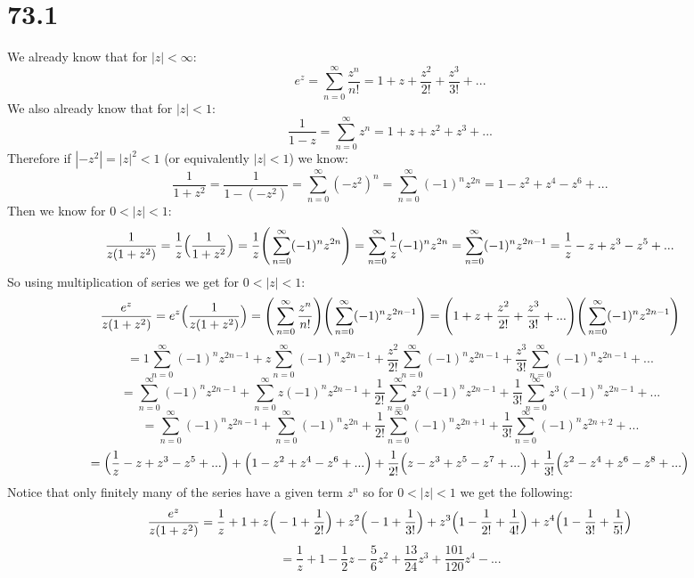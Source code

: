 \documentclass{article}
\begin{document}
\section*{73.1}
\begin{center}
    \doublespacing
    We already know that for $|z| <\infty$:
    \[e^z =\sum _{n=0}^{\infty}\frac{z^n}{n!} = 1 + z +\frac{z^2}{2!} +\frac{z^3}{3!} + ...\]
    We also already know that for $|z| < 1$:
    \[\frac{1}{1 - z} =\sum _{n=0}^{\infty} z^n = 1 + z + z^2 + z^3 + ...\]
    Therefore if $|-z^2| = |z|^2 < 1$ (or equivalently $|z| < 1$) we know:
    \[\frac{1}{1 + z^2} =\frac{1}{1 - (-z^2)} =\sum _{n=0}^{\infty} (-z^2)^n =\sum _{n=0}^{\infty} (-1)^n z^{2n} = 1 - z^2 + z^4 - z^6 + ...\]
    Then we know for $0 < |z| < 1$:
    \[\frac{1}{z(1 + z^2)} =\frac{1}{z}\Big{(}\frac{1}{1 + z^2}\Big{)} =\frac{1}{z}\Bigg{(}\sum _{n=0}^{\infty} (-1)^n z^{2n}\Bigg{)} =\sum _{n=0}^{\infty}\frac{1}{z}(-1)^n z^{2n} =\sum _{n=0}^{\infty} (-1)^n z^{2n-1} =\frac{1}{z} - z + z^3 - z^5 + ...\]
    \break
    So using multiplication of series we get for $0 < |z| < 1$:
    \[\frac{e^z}{z(1 + z^2)} = e^z\Big{(}\frac{1}{z(1 + z^2)}\Big{)} =\Bigg{(}\sum _{n=0}^{\infty}\frac{z^n}{n!}\Bigg{)}\Bigg{(}\sum _{n=0}^{\infty} (-1)^n z^{2n-1}\Bigg{)} =\Bigg{(}1 + z +\frac{z^2}{2!} +\frac{z^3}{3!} + ...\Bigg{)}\Bigg{(}\sum _{n=0}^{\infty} (-1)^n z^{2n-1}\Bigg{)}\]
    \[= 1\sum _{n=0}^{\infty} (-1)^n z^{2n-1} + z\sum _{n=0}^{\infty} (-1)^n z^{2n-1} +\frac{z^2}{2!}\sum _{n=0}^{\infty} (-1)^n z^{2n-1} +\frac{z^3}{3!}\sum _{n=0}^{\infty} (-1)^n z^{2n-1} + ...\]
    \[=\sum _{n=0}^{\infty} (-1)^n z^{2n-1} +\sum _{n=0}^{\infty} z (-1)^n z^{2n-1} +\frac{1}{2!}\sum _{n=0}^{\infty} z^2 (-1)^n z^{2n-1} +\frac{1}{3!}\sum _{n=0}^{\infty} z^3 (-1)^n z^{2n-1} + ...\]
    \[=\sum _{n=0}^{\infty} (-1)^n z^{2n-1} +\sum _{n=0}^{\infty} (-1)^n z^{2n} +\frac{1}{2!}\sum _{n=0}^{\infty} (-1)^n z^{2n+1} +\frac{1}{3!}\sum _{n=0}^{\infty} (-1)^n z^{2n+2} + ...\]
    \[=\Big{(}\frac{1}{z} - z + z^3 - z^5 + ...\Big{)} +\Big{(}1 - z^2 + z^4 - z^6 + ...\Big{)} +\frac{1}{2!}\Big{(}z - z^3 + z^5 - z^7 + ...\Big{)} +\frac{1}{3!}\Big{(}z^2 - z^4 + z^6 - z^8 + ...\Big{)}\]
    Notice that only finitely many of the series have a given term $z^n$ so for $0 < |z| < 1$ we get the following:
    \[\frac{e^z}{z(1 + z^2)} =\frac{1}{z} + 1 + z\Big{(}-1 +\frac{1}{2!}\Big{)} + z^2\Big{(}-1 +\frac{1}{3!}\Big{)} + z^3\Big{(}1 -\frac{1}{2!} +\frac{1}{4!}\Big{)} + z^4\Big{(}1 -\frac{1}{3!} +\frac{1}{5!}\Big{)}\]
    \[=\frac{1}{z} + 1 -\frac{1}{2} z -\frac{5}{6} z^2 +\frac{13}{24} z^3 +\frac{101}{120} z^4 - ...\]
\end{center}
\end{document}
